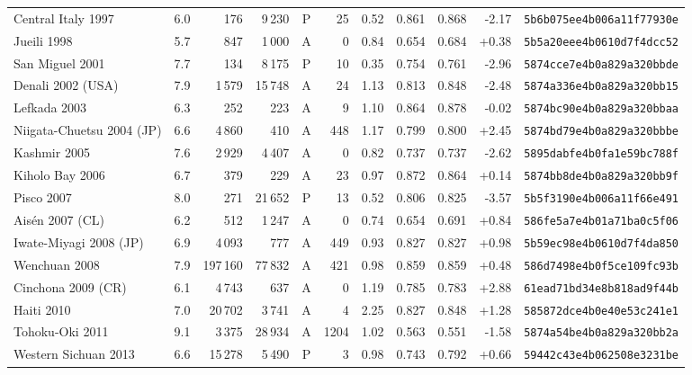 \begin{longtable}{lrrrcrrrrrl}
Central Italy 1997 & 6.0 & 176 & 9\,230 & P & 25 & 0.52 & 0.861 & 0.868 & -2.17 & \texttt{\scriptsize 5b6b075ee4b006a11f77930e}\\
Jueili 1998 & 5.7 & 847 & 1\,000 & A & 0 & 0.84 & 0.654 & 0.684 & +0.38 & \texttt{\scriptsize 5b5a20eee4b0610d7f4dcc52}\\
San Miguel 2001 & 7.7 & 134 & 8\,175 & P & 10 & 0.35 & 0.754 & 0.761 & -2.96 & \texttt{\scriptsize 5874cce7e4b0a829a320bbde}\\
Denali 2002 (USA) & 7.9 & 1\,579 & 15\,748 & A & 24 & 1.13 & 0.813 & 0.848 & -2.48 & \texttt{\scriptsize 5874a336e4b0a829a320bb15}\\
Lefkada 2003 & 6.3 & 252 & 223 & A & 9 & 1.10 & 0.864 & 0.878 & -0.02 & \texttt{\scriptsize 5874bc90e4b0a829a320bbaa}\\
Niigata-Chuetsu 2004 (JP) & 6.6 & 4\,860 & 410 & A & 448 & 1.17 & 0.799 & 0.800 & +2.45 & \texttt{\scriptsize 5874bd79e4b0a829a320bbbe}\\
Kashmir 2005 & 7.6 & 2\,929 & 4\,407 & A & 0 & 0.82 & 0.737 & 0.737 & -2.62 & \texttt{\scriptsize 5895dabfe4b0fa1e59bc788f}\\
Kiholo Bay 2006 & 6.7 & 379 & 229 & A & 23 & 0.97 & 0.872 & 0.864 & +0.14 & \texttt{\scriptsize 5874bb8de4b0a829a320bb9f}\\
Pisco 2007 & 8.0 & 271 & 21\,652 & P & 13 & 0.52 & 0.806 & 0.825 & -3.57 & \texttt{\scriptsize 5b5f3190e4b006a11f66e491}\\
Ais\'{e}n 2007 (CL) & 6.2 & 512 & 1\,247 & A & 0 & 0.74 & 0.654 & 0.691 & +0.84 & \texttt{\scriptsize 586fe5a7e4b01a71ba0c5f06}\\
Iwate-Miyagi 2008 (JP) & 6.9 & 4\,093 & 777 & A & 449 & 0.93 & 0.827 & 0.827 & +0.98 & \texttt{\scriptsize 5b59ec98e4b0610d7f4da850}\\
Wenchuan 2008 & 7.9 & 197\,160 & 77\,832 & A & 421 & 0.98 & 0.859 & 0.859 & +0.48 & \texttt{\scriptsize 586d7498e4b0f5ce109fc93b}\\
Cinchona 2009 (CR) & 6.1 & 4\,743 & 637 & A & 0 & 1.19 & 0.785 & 0.783 & +2.88 & \texttt{\scriptsize 61ead71bd34e8b818ad9f44b}\\
Haiti 2010 & 7.0 & 20\,702 & 3\,741 & A & 4 & 2.25 & 0.827 & 0.848 & +1.28 & \texttt{\scriptsize 585872dce4b0e40e53c241e1}\\
Tohoku-Oki 2011 & 9.1 & 3\,375 & 28\,934 & A & 1204 & 1.02 & 0.563 & 0.551 & -1.58 & \texttt{\scriptsize 5874a54be4b0a829a320bb2a}\\
Western Sichuan 2013 & 6.6 & 15\,278 & 5\,490 & P & 3 & 0.98 & 0.743 & 0.792 & +0.66 & \texttt{\scriptsize 59442c43e4b062508e3231be}\\

\end{longtable}
